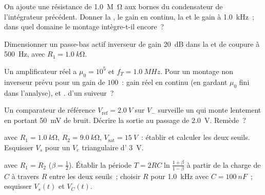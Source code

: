 \begin{exercise}[$\star\star$]\label{exo:b1:operational-amplifier:7}
On ajoute une résistance de \qty{1.0}{M\ohm} aux bornes du condensateur
de l'intégrateur précédent. Donner la , le gain en
continu, la  et le gain à \qty{1.0}{kHz}~; dans
quel domaine le montage intègre-t-il encore~?
\end{exercise}

\begin{exercise}[$\star\star$]\label{exo:b1:operational-amplifier:8}
Dimensionner un passe-bas actif inverseur de gain \qty{20}{dB} dans la
 et de coupure à \qty{500}{Hz}, avec $R_1 = \qty{1.0}{k\ohm}$.
\end{exercise}

\begin{exercise}[$\star\star$]\label{exo:b1:operational-amplifier:9}
Un amplificateur réel a $\mu_0 = 10^5$ et $f_T = \qty{1.0}{MHz}$. Pour
un montage non inverseur prévu pour un gain de $100$~: gain réel en
continu (en gardant $\mu_0$ fini dans l'analyse), et .
 d'un suiveur~?
\end{exercise}

\begin{exercise}[$\star\star\star$]\label{exo:b1:operational-amplifier:10}
Un comparateur de référence $V_{\mathrm{ref}} = \qty{2.0}{V}$ sur $V_-$
surveille un  qui monte lentement en portant \qty{50}{mV} de
bruit. Décrire la sortie au passage de \qty{2.0}{V}. Remède~?
\end{exercise}

\begin{exercise}[$\star\star\star$]\label{exo:b1:operational-amplifier:11}
 avec $R_1 = \qty{1.0}{k\ohm}$, $R_2 = \qty{9.0}{k\ohm}$,
$V_{\mathrm{sat}} = \qty{15}{V}$~: établir et calculer les deux seuils.
Esquisser $V_s$ pour un $V_e$ triangulaire d' \qty{3}{V}.
\end{exercise}

\begin{exercise}[$\star\star\star$]\label{exo:b1:operational-amplifier:12}
 avec $R_1 = R_2$ ($\beta = \tfrac12$). Établir
la période $T = 2RC\ln\frac{1 + \beta}{1 - \beta}$ à partir de la charge
de $C$ à travers $R$ entre les deux seuils~; choisir $R$ pour
\qty{1.0}{kHz} avec $C = \qty{100}{nF}$~; esquisser $V_s(t)$ et $V_C(t)$.
\end{exercise}

